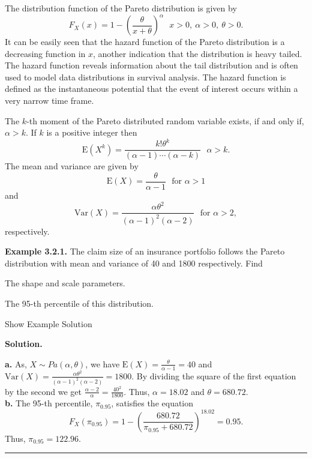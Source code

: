 \documentclass[]{book}
\theoremstyle{definition}
\theoremstyle{definition}
\theoremstyle{definition}
\theoremstyle{remark}
\begin{document}
The distribution function of the Pareto distribution is given by
\[F_{X}\left( x \right) = 1 - \left( \frac{\theta}{x + \theta} \right)^{\alpha}  \ \ \ x > 0,\ \alpha > 0,\ \theta > 0.\]
It can be easily seen that the hazard function of the Pareto
distribution is a decreasing function in \(x\), another indication that
the distribution is heavy tailed. The hazard function reveals
information about the tail distribution and is often used to model data
distributions in survival analysis. The hazard function is defined as
the instantaneous potential that the event of interest occurs within a
very narrow time frame.

The \(k\)-th moment of the Pareto distributed random variable exists, if
and only if, \(\alpha > k\). If \(k\) is a positive integer then
\[\mathrm{E}\left( X^{k} \right) = \frac{k!\theta^{k}}{\left( \alpha - 1 \right)\cdots\left( \alpha - k \right)} \ \ \ \alpha > k.\]
The mean and variance are given by
\[\mathrm{E}\left( X \right) = \frac{\theta}{\alpha - 1} \ \ \ \text{for } \alpha > 1\]
and
\[\mathrm{Var}\left( X \right) = \frac{\alpha\theta^{2}}{\left( \alpha - 1 \right)^{2}\left( \alpha - 2 \right)} \ \ \ \text{for } \alpha > 2,\]respectively.

\textbf{Example 3.2.1. } The claim size of an insurance portfolio
follows the Pareto distribution with mean and variance of 40 and 1800
respectively. Find

The shape and scale parameters.

The 95-th percentile of this distribution.

Show Example Solution

\hypertarget{toggleExampleLoss.2.1}{}
\textbf{Solution.}

\textbf{a.} As, \(X\sim Pa(\alpha,\theta)\), we have
\(\mathrm{E}\left( X \right) = \frac{\theta}{\alpha - 1} = 40\) and
\(\mathrm{Var}\left( X \right) = \frac{\alpha\theta^{2}}{\left( \alpha - 1 \right)^{2}\left( \alpha - 2 \right)} = 1800\).
By dividing the square of the first equation by the second we get
\(\frac{\alpha - 2}{\alpha} = \frac{40^{2}}{1800}\). Thus,
\(\alpha = 18.02\) and \(\theta = 680.72\).\\
\textbf{b.} The 95-th percentile, \(\pi_{0.95}\), satisfies the equation
\[F_{X}\left( \pi_{0.95} \right) = 1 - \left( \frac{680.72}{\pi_{0.95} + 680.72} \right)^{18.02} = 0.95.\]
Thus, \(\pi_{0.95} = 122.96\).

\begin{center}\rule{0.5\linewidth}{\linethickness}\end{center}
\end{document}
